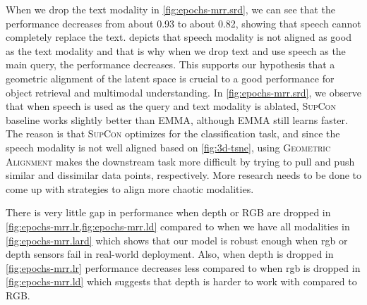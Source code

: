 \documentclass[10pt]{article} %
\newcommand{\ours}{\textsc{EMMA}}
\newcommand{\geom}{\textsc{Geometric Alignment}}
\newcommand{\supcon}{\textsc{SupCon}}
\begin{document}
When we drop the text modality in \cref{fig:epochs-mrr.srd}, we can see that the performance decreases from about 0.93 to about 0.82, showing that speech cannot completely replace the text.  depicts that speech modality is not aligned as good as the text modality and that is why when we drop text and use speech as the main query, the performance decreases. This supports our hypothesis that a geometric alignment of the latent space is crucial to a good performance for object retrieval and multimodal understanding.
In \cref{fig:epochs-mrr.srd}, we observe that when speech is used as the query and text modality is ablated, \supcon{} baseline works slightly better than \ours{}, although \ours{} still learns faster. The reason is that \supcon{} optimizes for the classification task, and since the speech modality is not well aligned based on \cref{fig:3d-tsne}, using \geom{} makes the downstream task more difficult by trying to pull and push similar and dissimilar data points, respectively. More research needs to be done to come up with strategies to align more chaotic modalities.

There is very little gap in performance when depth or RGB are dropped in \cref{fig:epochs-mrr.lr,fig:epochs-mrr.ld} compared to when we have all modalities in \cref{fig:epochs-mrr.lard} which shows that our model is robust enough when rgb or depth sensors fail in real-world deployment. Also, when depth is dropped in \cref{fig:epochs-mrr.lr} performance decreases less compared to when rgb is dropped in \cref{fig:epochs-mrr.ld} which suggests that depth is harder to work with compared to RGB. 
\end{document}
